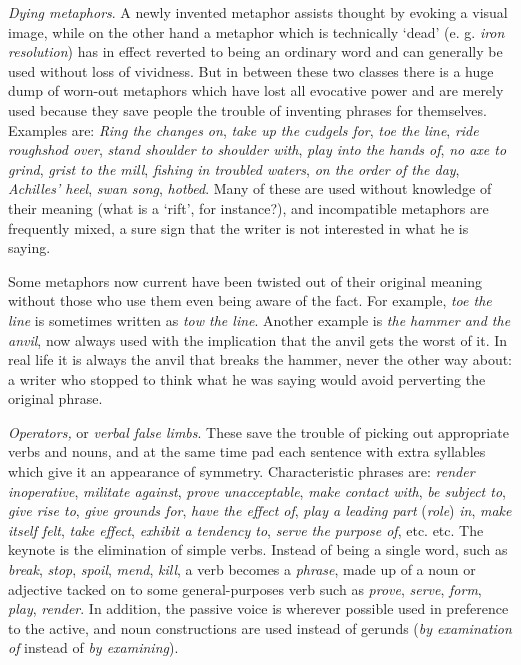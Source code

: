 \textit{Dying metaphors}. A newly invented metaphor assists thought by evoking a visual image, while on the other hand a metaphor which is technically ‘dead’ (e. g. \textit{iron resolution}) has in effect reverted to being an ordinary word and can generally be used without loss of vividness. But in between these two classes there is a huge dump of worn-out metaphors which have lost all evocative power and are merely used because they save people the trouble of inventing phrases for themselves. Examples are: \textit{Ring the changes on}, \textit{take up the cudgels for}, \textit{toe the line}, \textit{ride roughshod over}, \textit{stand shoulder to shoulder with}, \textit{play into the hands of}, \textit{no axe to grind}, \textit{grist to the mill}, \textit{fishing in troubled waters}, \textit{on the order of the day}, \textit{Achilles’ heel}, \textit{swan song}, \textit{hotbed}. Many of these are used without knowledge of their meaning (what is a ‘rift’, for instance?), and incompatible metaphors are frequently mixed, a sure sign that the writer is not interested in what he is saying.\par

Some metaphors now current have been twisted out of their original meaning without those who use them even being aware of the fact. For example, \textit{toe the line} is sometimes written as\textit{ tow the line}. Another example is \textit{the hammer and the anvil}, now always used with the implication that the anvil gets the worst of it. In real life it is always the anvil that breaks the hammer, never the other way about: a writer who stopped to think what he was saying would avoid perverting the original phrase.\par

\textit{Operators, }or \textit{verbal false limbs}. These save the trouble of picking out appropriate verbs and nouns, and at the same time pad each sentence with extra syllables which give it an appearance of symmetry. Characteristic phrases are: \textit{render inoperative}, \textit{militate against}, \textit{prove unacceptable}, \textit{make contact with}, \textit{be subject to}, \textit{give rise to}, \textit{give grounds for}, \textit{have the effect of}, \textit{play a leading part} (\textit{role}) \textit{in}, \textit{make itself felt}, \textit{take effect}, \textit{exhibit a tendency to}, \textit{serve the purpose of}, etc. etc. The keynote is the elimination of simple verbs. Instead of being a single word, such as \textit{break}, \textit{stop}, \textit{spoil}, \textit{mend}, \textit{kill}, a verb becomes a \textit{phrase}, made up of a noun or adjective tacked on to some general-purposes verb such as \textit{prove}, \textit{serve}, \textit{form}, \textit{play}, \textit{render}. In addition, the passive voice is wherever possible used in preference to the active, and noun constructions are used instead of gerunds (\textit{by examination of} instead of \textit{by examining}).\par

